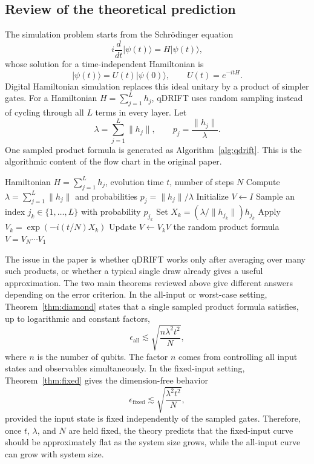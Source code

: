 ﻿\documentclass[12pt]{article}
\theoremstyle{plain}
\theoremstyle{definition}
\newcommand{\norm}[1]{\lVert #1 \rVert}
\newcommand{\ket}[1]{\lvert #1 \rangle}
\begin{document}
	\subsection{Review of the theoretical prediction}

	The simulation problem starts from the Schr\"odinger equation
	\[
	i\frac{d}{dt}\ket{\psi(t)}=H\ket{\psi(t)},
	\]
	whose solution for a time-independent Hamiltonian is
	\[
	\ket{\psi(t)}=U(t)\ket{\psi(0)},\qquad U(t)=e^{-itH}.
	\]
	Digital Hamiltonian simulation replaces this ideal unitary by a product of simpler gates. For a Hamiltonian $H=\sum_{j=1}^L h_j$, qDRIFT uses random sampling instead of cycling through all $L$ terms in every layer. Let
	\[
	\lambda=\sum_{j=1}^L\norm{h_j},\qquad p_j=\frac{\norm{h_j}}{\lambda}.
	\]
	One sampled product formula is generated as Algorithm~\ref{alg:qdrift}. This is the algorithmic content of the flow chart in the original paper.

	\begin{algorithm}[H]
		\caption{qDRIFT random product formula}
		\label{alg:qdrift}
		\begin{algorithmic}[1]
			\Require Hamiltonian $H=\sum_{j=1}^L h_j$, evolution time $t$, number of steps $N$
			\State Compute $\lambda=\sum_{j=1}^L\norm{h_j}$ and probabilities $p_j=\norm{h_j}/\lambda$
			\State Initialize $V\gets I$
				\State Sample an index $j_k\in\{1,\ldots,L\}$ with probability $p_{j_k}$
				\State Set $X_k=(\lambda/\norm{h_{j_k}})h_{j_k}$
				\State Apply $V_k=\exp\!\left(-i(t/N)X_k\right)$
				\State Update $V\gets V_kV$
			\EndFor
			\State \Return the random product formula $V=V_N\cdots V_1$
		\end{algorithmic}
	\end{algorithm}

	The issue in the paper is whether qDRIFT works only after averaging over many such products, or whether a typical single draw already gives a useful approximation. The two main theorems reviewed above give different answers depending on the error criterion. In the all-input or worst-case setting, Theorem~\ref{thm:diamond} states that a single sampled product formula satisfies, up to logarithmic and constant factors,
	\[
	\epsilon_{\mathrm{all}}\lesssim \sqrt{\frac{n\lambda^2t^2}{N}},
	\]
	where $n$ is the number of qubits. The factor $n$ comes from controlling all input states and observables simultaneously. In the fixed-input setting, Theorem~\ref{thm:fixed} gives the dimension-free behavior
	\[
	\epsilon_{\mathrm{fixed}}\lesssim \sqrt{\frac{\lambda^2t^2}{N}},
	\]
	provided the input state is fixed independently of the sampled gates. Therefore, once $t$, $\lambda$, and $N$ are held fixed, the theory predicts that the fixed-input curve should be approximately flat as the system size grows, while the all-input curve can grow with system size.
\end{document}

